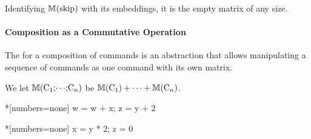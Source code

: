Identifying $\sfm{\prc|skip|}$ with its embeddings, it is the empty
matrix of any size.

\paragraph{Composition as a Commutative Operation}
\label{ni-composition}

The  for a composition of commands is an abstraction
that allows manipulating a sequence of commands as one command with its own
matrix.

\begin{definition}[Composition]
We let \ensuremath{\sfm{\prc|C$_1$;$\cdots$;C$_n$|}}
be \ensuremath{\sfm{\prc|C$_1$|} + \cdots + \sfm{\prc|C$_n$|}}.
\end{definition}

\newsavebox\compone
\begin{lrbox}{\compone}
\begin{minipage}{.25\linewidth}
\begin{whilelisting}*[numbers=none]
w = w + x;
z = y + 2
\end{whilelisting}
\end{minipage}
\end{lrbox}

\newsavebox\comptwo
\begin{lrbox}{\comptwo}
\begin{minipage}{.25\linewidth}
\begin{whilelisting}*[numbers=none]
x = y * 2;
z = 0
\end{whilelisting}
\end{minipage}
\end{lrbox}

